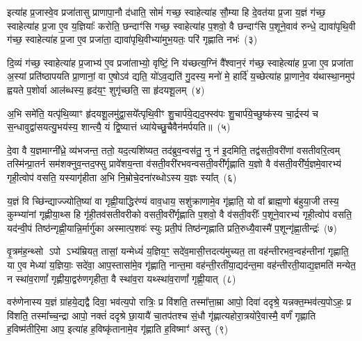 इत्या॑ह प्र॒जास्वे॒व प्रजा॑तासु प्राणापा॒नौ द॑धाति॒ सोमं॑ गच्छ॒ स्वाहेत्या॑ह सौ॒म्या हि दे॒वत॑या प्र॒जा य॒ज्ञं ग॑च्छ॒ स्वाहेत्या॑ह प्र॒जा ए॒व य॒ज्ञियाः᳚ करोति॒ छन्दाꣳ॑सि गच्छ॒ स्वाहेत्या॑ह प॒शवो॒ वै छन्दाꣳ॑सि प॒शूने॒वाव॑ रुन्धे॒ द्यावा॑पृथि॒वी ग॑च्छ॒ स्वाहेत्या॑ह प्र॒जा ए॒व प्रजा॑ता॒ द्यावा॑पृथि॒वीभ्या॑मुभ॒यतः॒ परि॑ गृह्णाति नभः॑~(३)

दि॒व्यं ग॑च्छ॒ स्वाहेत्या॑ह प्र॒जाभ्य॑ ए॒व प्रजा॑ताभ्यो॒ वृष्टिं॒ नि य॑च्छत्य॒ग्निं वै᳚श्वान॒रं ग॑च्छ॒ स्वाहेत्या॑ह प्र॒जा ए॒व प्रजा॑ता अ॒स्यां प्रति॑\-ष्ठापयति प्रा॒णानां॒ वा ए॒षो\-ऽव॑ द्यति॒ यो॑\-ऽव॒द्यति॑ गु॒दस्य॒ मनो॑ मे॒ हार्दि॑ य॒च्छेत्या॑ह प्रा॒णाने॒व य॑थास्था॒नमुप॑ ह्वयते प॒शोर्वा आल॑ब्धस्य॒ हृद॑य॒ꣳ॒ शुगृ॑च्छति॒ सा हृ॑दयशू॒लम्~(४)

अ॒भि समे॑ति॒ यत्पृ॑थि॒व्याꣳ हृ॑दयशू॒लमु॑द्वा॒सये᳚त्पृथि॒वीꣳ शु॒चार्प॑ये॒द्यद॒फ्स्व॑पः शु॒चार्प॑ये॒च्छुष्क॑स्य चा॒र्द्रस्य॑ च स॒न्धावुद्वा॑सयत्यु॒भय॑स्य॒ शान्त्यै॒ यं द्वि॒ष्यात्तं ध्या॑येच्छु॒चैवैन॑मर्पयति॥~(५)

{\anuvakamend[{रेतो॑ मि॒त्रावरु॑णौ गच्छ॒ स्वाहा॒ नभो॑ हृदयशू॒लं द्वात्रिꣳ॑शच्च}]}%

दे॒वा वै य॒ज्ञमाग्नी᳚ध्रे॒ व्य॑भजन्त॒ ततो॒ यद॒त्यशि॑ष्यत॒ तद॑ब्रुव॒न्वस॑तु॒ नु न॑ इ॒दमिति॒ तद्व॑सती॒वरी॑णां वसतीवरि॒त्वम् तस्मि॑न्प्रा॒तर्न सम॑शक्नुव॒न्तद॒फ्सु प्रावे॑शय॒न्ता व॑सती॒वरी॑रभवन्वसती॒वरी᳚र्गृह्णाति य॒ज्ञो वै व॑सती॒वरी᳚र्य॒ज्ञमे॒वारभ्य॑ गृही॒त्वोप॑ वसति॒ यस्यागृ॑हीता अ॒भि नि॒म्रोचे॒दना॑रब्धो\-ऽस्य य॒ज्ञः स्या᳚त्~(६)

य॒ज्ञं वि च्छि॑न्द्याज्ज्योति॒ष्या॑ वा गृह्णी॒याद्धिर॑ण्यं वाव॒धाय॒ सशु॑क्राणामे॒व गृ॑ह्णाति॒ यो वा᳚ ब्राह्म॒णो ब॑हुया॒जी तस्य॒ कुम्भ्या॑नां गृह्णीया॒थ्स हि गृ॑ही॒तव॑सतीवरीको वसती॒वरी᳚र्गृह्णाति प॒शवो॒ वै व॑सती॒वरीः᳚ प॒शूने॒वारभ्य॑ गृही॒त्वोप॑ वसति॒ यद॑न्वी॒पं तिष्ठ॑न्गृह्णी॒यान्नि॒र्मार्गु॑का अस्मात्प॒शवः॑ स्युः प्रती॒पं तिष्ठ॑न्गृह्णाति प्रति॒रुध्यै॒वास्मै॑ प॒शून्गृ॑ह्णा॒तीन्द्रः॑~(७)

वृ॒त्रम॑ह॒न्थ्सो \-ऽपो \-ऽभ्य॑म्रियत॒ तासां॒ यन्मेध्यं॑ य॒ज्ञिय॒ꣳ॒ सदे॑व॒मासी॒त्तदत्य॑मुच्यत॒ ता वह॑न्तीरभव॒न्वह॑न्तीनां गृह्णाति॒ या ए॒व मेध्या॑ य॒ज्ञियाः॒ सदे॑वा॒ आप॒स्तासा॑मे॒व गृ॑ह्णाति॒ नान्त॒मा वह॑न्ती॒रती॑या॒द्यद॑न्त॒मा वह॑न्तीरती॒याद्य॒ज्ञमति॑ मन्येत॒ न स्था॑व॒राणां᳚ गृह्णीया॒द्वरु॑णगृहीता॒ वै स्था॑व॒रा यथ्स्था॑व॒राणां᳚ गृह्णी॒यात्~(८)

वरु॑णेनास्य य॒ज्ञं ग्रा॑हये॒द्यद्वै दिवा॒ भव॑त्य॒पो रात्रिः॒ प्र वि॑शति॒ तस्मा᳚त्ता॒म्रा आपो॒ दिवा॑ ददृश्रे॒ यन्नक्त॒म्भव॑त्य॒पो\-ऽहः॒ प्र वि॑शति॒ तस्मा᳚च्च॒न्द्रा आपो॒ नक्तं॑ ददृश्रे छा॒यायै॑ चा॒तप॑तश्च सं॒धौ गृ॑ह्णात्यहोरा॒त्रयो॑रे॒वास्मै॒ वर्णं॑ गृह्णाति ह॒विष्म॑तीरि॒मा आप॒ इत्या॑ह ह॒विष्कृ॑तानामे॒व गृ॑ह्णाति ह॒विष्माꣳ॑ अस्तु~(९)

